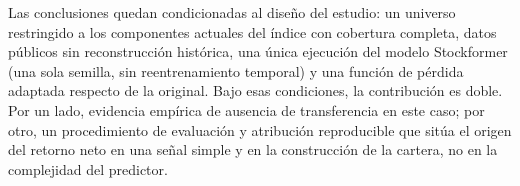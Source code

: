 Las conclusiones quedan condicionadas al diseño del estudio: un universo restringido a los
componentes actuales del índice con cobertura completa, datos públicos sin reconstrucción
histórica, una única ejecución del modelo Stockformer (una sola semilla, sin reentrenamiento
temporal) y una función de pérdida adaptada respecto de la original. Bajo esas condiciones, la contribución es doble. Por un lado, evidencia empírica
de ausencia de transferencia en este caso; por otro, un procedimiento de evaluación y
atribución reproducible que sitúa el origen del retorno neto en una señal simple y en la
construcción de la cartera, no en la complejidad del predictor.